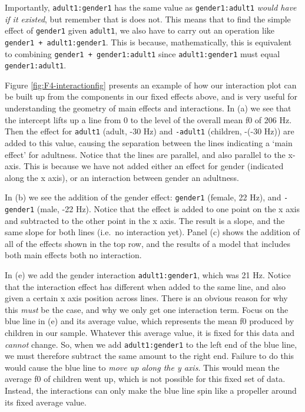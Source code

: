 \documentclass[
]{book}
\begin{document}
Importantly, \texttt{adult1:gender1} has the same value as \texttt{gender1:adult1} \emph{would have if it existed}, but remember that is does not. This means that to find the simple effect of \texttt{gender1} given \texttt{adult1}, we also have to carry out an operation like \texttt{gender1\ +\ adult1:gender1}. This is because, mathematically, this is equivalent to combining \texttt{gender1\ +\ gender1:adult1} since \texttt{adult1:gender1} must equal \texttt{gender1:adult1}.

Figure \ref{fig:F4-interactionfig} presents an example of how our interaction plot can be built up from the components in our fixed effects above, and is very useful for understanding the geometry of main effects and interactions. In (a) we see that the intercept lifts up a line from 0 to the level of the overall mean f0 of 206 Hz. Then the effect for \texttt{adult1} (adult, -30 Hz) and \texttt{-adult1} (children, -(-30 Hz)) are added to this value, causing the separation between the lines indicating a `main effect' for adultness. Notice that the lines are parallel, and also parallel to the x-axis. This is because we have not added either an effect for gender (indicated along the x axis), or an interaction between gender an adultness.

In (b) we see the addition of the gender effect: \texttt{gender1} (female, 22 Hz), and \texttt{-gender1} (male, -22 Hz). Notice that the effect is added to one point on the x axis and subtracted to the other point in the x axis. The result is a slope, and the same slope for both lines (i.e.~no interaction yet). Panel (c) shows the addition of all of the effects shown in the top row, and the results of a model that includes both main effects both no interaction.

In (e) we add the gender interaction \texttt{adult1:gender1}, which was 21 Hz. Notice that the interaction effect has different when added to the same line, and also given a certain x axis position across lines. There is an obvious reason for why this \emph{must} be the case, and why we only get one interaction term. Focus on the blue line in (e) and its average value, which represents the mean f0 produced by children in our sample. Whatever this average value, it is fixed for this data and \emph{cannot} change. So, when we add \texttt{adult1:gender1} to the left end of the blue line, we must therefore subtract the same amount to the right end. Failure to do this would cause the blue line to \emph{move up along the y axis}. This would mean the average f0 of children went up, which is not possible for this fixed set of data. Instead, the interactions can only make the blue line spin like a propeller around its fixed average value.
\end{document}
